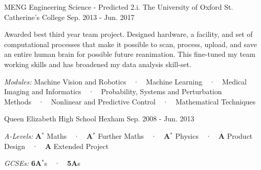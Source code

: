 
      

\begin{cventries}
    \cventry
        {MENG Engineering Science - Predicted 2.i.}
        {The University of Oxford}
        {St. Catherine's College}
        {Sep. 2013 - Jun. 2017}
        {
          \begin{cvitems}
            \item{Awarded best third year team project. Designed hardware, a facility, and set of computational processes that make it possible to scan, process, upload, and save an entire human brain for possible future reanimation. This fine-tuned my team working skills and has broadened my data analysis skill-set.}
            \item{\textit{Modules:} Machine Vision and Robotics~~·~~Machine Learning~~·~~Medical Imaging and Informatics~~·~~Probability, Systems and Perturbation Methods~~·~~Nonlinear and Predictive Control~~·~~Mathematical Techniques}
          \end{cvitems}
        }
    \cventry
        {}
        {Queen Elizabeth High School}
        {Hexham}
        {Sep. 2008 - Jun. 2013}
        {\vspace{-0.5cm}
          \begin{cvitems}
            \item {\textit{A-Levels:} \textbf{A${^*}$} Maths~~·~~\textbf{A${^*}$} Further Maths~~·~~\textbf{A${^*}$} Physics~~·~~\textbf{A} Product Design~~·~~\textbf{A} Extended Project}
            \item {\textit{GCSEs:} \textbf{6A${^*}$}s~~·~~\textbf{5A}s} 
          \end{cvitems}
        }

\end{cventries}
